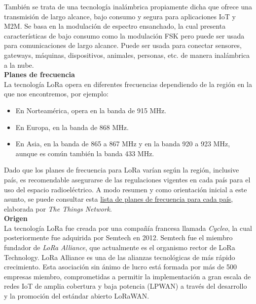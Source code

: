 \documentclass[12pt]{article}
\begin{document}
	\noindent También se trata de una tecnología inalámbrica propiamente dicha que ofrece una transmisión de largo alcance, bajo consumo y segura para aplicaciones IoT y M2M. Se basa en la modulación de espectro ensanchado, la cual presenta características de bajo consumo como la modulación FSK pero puede ser usada para comunicaciones de largo alcance. Puede ser usada para conectar sensores, gateways, máquinas, dispositivos, animales, personas, etc. de manera inalámbrica a la nube.\\
	
	\noindent \textbf{Planes de frecuencia} \\
	
	\noindent La tecnología LoRa opera en diferentes frecuencias dependiendo de la región en la que nos encontremos, por ejemplo: \\
	
	\begin{itemize}
		\item En Norteamérica, opera en la banda de 915 MHz.
		\item En Europa, en la banda de 868 MHz.
		\item En Asia, en la banda de 865 a 867 MHz y en la banda 920 a 923 MHz, aunque es común también la banda 433 MHz.
	\end{itemize}
	
	\noindent Dado que los planes de frecuencia para LoRa varían según la región, inclusive país, es recomendable asegurarse de las regulaciones vigentes en cada país para el uso del espacio radioeléctrico. A modo resumen y como orientación inicial a este asunto, se puede consultar esta \href{https://www.thethingsnetwork.org/docs/lorawan/frequencies-by-country/index.html}{lista de planes de frecuencia para cada país}, elaborada por \textit{The Things Network}. \\
	
	\noindent \textbf{Origen} \\
	
	\noindent La tecnología LoRa fue creada por una compañía francesa llamada \textit{Cycleo}, la cual posteriormente fue adquirida por Semtech en 2012. Semtech fue el miembro fundador de \textit{LoRa Alliance}, que actualmente es el organismo rector de LoRa Technology. LoRa Alliance es una de las alianzas tecnológicas de más rápido crecimiento. Esta asociación sin ánimo de lucro está formada por más de 500 empresas miembro, comprometidas a permitir la implementación a gran escala de redes IoT de amplia cobertura y baja potencia (LPWAN) a través del desarrollo y la promoción del estándar abierto LoRaWAN.\\
	
\end{document}
